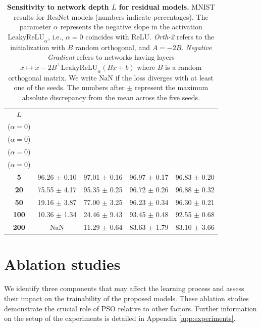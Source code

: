 \documentclass{article}
\theoremstyle{plain}
\theoremstyle{definition}
\theoremstyle{definition}
\theoremstyle{remark}
\theoremstyle{definition}
\theoremstyle{definition}
\theoremstyle{remark}
\numberwithin{equation}{section}
\begin{document}
\begin{table}[ht!]
  \centering
  \caption{\textbf{Sensitivity to network depth $L$ for residual models.} MNIST results for ResNet models (numbers indicate percentages). The parameter $\alpha$ represents the negative slope in the activation $\mathrm{LeakyReLU}_{\alpha}$, i.e., $\alpha=0$ coincides with $\mathrm{ReLU}$. \textit{Orth-2} refers to the initialization with $B$ random orthogonal, and $A=-2B$. \textit{Negative Gradient} refers to networks having layers $x\mapsto x-2B^\top\mathrm{LeakyReLU}_\alpha(Bx+b)$ where $B$ is a random orthogonal matrix. We write $\mathrm{NaN}$ if the loss diverges with at least one of the seeds. The numbers after $\pm$ represent the maximum absolute discrepancy from the mean across the five seeds.}
  \label{tab:resnetMNIST}
  \vspace{10pt}
  \setlength{\tabcolsep}{10pt}
  \begin{tabular}{c|cccc}
    \toprule
    $L$ & \shortstack{\textbf{Kaiming}\\($\alpha=0$)} & \shortstack{\textbf{Orth Indep}\\($\alpha=0$)} & \shortstack{\textbf{Orth-2}\\($\alpha=0$)} & \shortstack{\textbf{Negative Gradient}\\($\alpha=0$)} \\
    \midrule
    \textbf{5}   & 96.26 $\pm$ 0.10 & {97.01 $\pm$ 0.16} & 96.97 $\pm$ 0.17 & 96.83 $\pm$ 0.20 \\
    \textbf{20}  & 75.55 $\pm$ 4.17 & 95.35 $\pm$ 0.25 & 96.72 $\pm$ 0.26 & 96.88 $\pm$ 0.32 \\
    \textbf{50}  & 19.16 $\pm$ 3.87 & 77.00 $\pm$ 3.25 & 96.23 $\pm$ 0.34 & 96.30 $\pm$ 0.21 \\
    \textbf{100} & 10.36 $\pm$ 1.34 & 24.46 $\pm$ 9.43 & 93.45 $\pm$ 0.48 & 92.55 $\pm$ 0.68 \\
    \textbf{200} & NaN & 11.29 $\pm$ 0.64 & 83.63 $\pm$ 1.79 & 83.10 $\pm$ 3.66 \\
    \bottomrule
  \end{tabular}
\end{table}

\section{Ablation studies}\label{app:ablations}
We identify three components that may affect the learning process and assess their impact on the trainability of the proposed models. These ablation studies demonstrate the crucial role of PSO relative to other factors. Further information on the setup of the experiments is detailed in Appendix \ref{app:experiments}.
\end{document}
